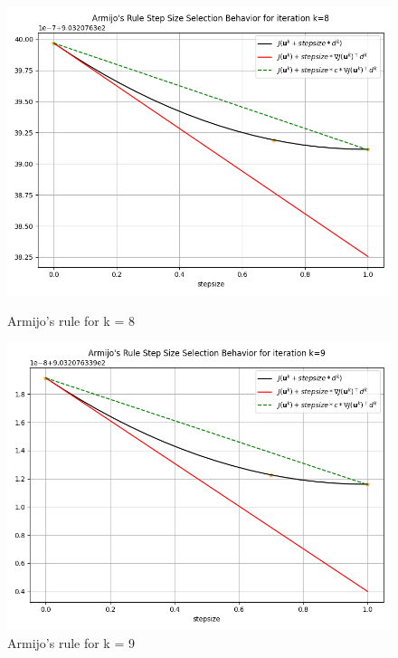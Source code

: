 \documentclass[a4paper,11pt,oneside]{book}
\begin{document}
\begin{itemize}
\begin{figure}[ht]
\begin{minipage}[t]{0.48\textwidth}
        \centering
        \includegraphics[width=\textwidth]{Armijo's_Rule_T1_k=8.png}
        \caption{Armijo's rule for k = 8}
        \label{fig:sinistra}
    \end{minipage}
    \hfill
    \begin{minipage}[t]{0.48\textwidth}
        \centering
        \includegraphics[width=\textwidth]{Armijo's_Rule_T1_k=9.png}
        \caption{Armijo's rule for k = 9}
        \label{fig:destra}
    \end{minipage}
\end{figure}


\end{itemize}
\end{document}
